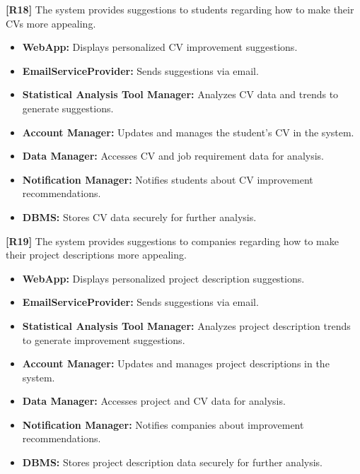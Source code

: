 \textbf{[R18]} The system provides suggestions to students regarding how to make their CVs more appealing.  
\begin{itemize}
    \item \textbf{WebApp:} Displays personalized CV improvement suggestions.  
    \item \textbf{EmailServiceProvider:} Sends suggestions via email.  
    \item \textbf{Statistical Analysis Tool Manager:} Analyzes CV data and trends to generate suggestions.  
    \item \textbf{Account Manager:} Updates and manages the student’s CV in the system.  
    \item \textbf{Data Manager:} Accesses CV and job requirement data for analysis.  
    \item \textbf{Notification Manager:} Notifies students about CV improvement recommendations.  
    \item \textbf{DBMS:} Stores CV data securely for further analysis.  
\end{itemize}  

\textbf{[R19]} The system provides suggestions to companies regarding how to make their project descriptions more appealing.  
\begin{itemize}
    \item \textbf{WebApp:} Displays personalized project description suggestions.  
    \item \textbf{EmailServiceProvider:} Sends suggestions via email.  
    \item \textbf{Statistical Analysis Tool Manager:} Analyzes project description trends to generate improvement suggestions.  
    \item \textbf{Account Manager:} Updates and manages project descriptions in the system.  
    \item \textbf{Data Manager:} Accesses project and CV data for analysis.  
    \item \textbf{Notification Manager:} Notifies companies about improvement recommendations.  
    \item \textbf{DBMS:} Stores project description data securely for further analysis.  
\end{itemize}  

